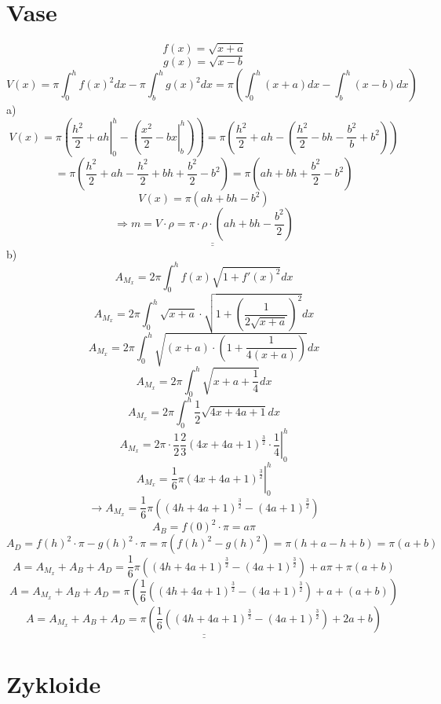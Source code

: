 \section{Vase}
\[ f(x) = \sqrt{x+a} \]
\[ g(x) = \sqrt{x-b} \]
\[ V(x) = \pi \int_0^h f(x)^2 dx - \pi \int_b^h g(x)^2dx = \pi \left( \int_0^h (x+a) dx - \int_b^h (x-b) dx\right) \]
a)
\[ V(x) = \pi\left(\left. \frac{h^2}{2} + ah \right|_0^h - \left(\left. \frac{x^2}{2} - bx \right|_b^h \right) \right) = \pi \left(  \frac{h^2}{2} + ah - \left( \frac{h^2}{2} - bh - \frac{b^2}{b} + b^2 \right)\right) \]
\[ = \pi \left(\frac{h^2}{2} + ah - \frac{h^2}{2} + bh + \frac{b^2}{2} - b^2\right) = \pi \left(ah + bh + \frac{b^2}{2} - b^2\right) \]
\[ V(x) = \pi \left(ah + bh - b^2\right) \]
\[ \Rightarrow \underline{\underline{m = V \cdot \rho = \pi \cdot \rho \cdot \left(ah + bh - \frac{b^2}{2}\right)}} \]
b)
\[ A_{M_x} = 2 \pi \int_0^h f(x) \sqrt{1 + f'(x)^2} dx \]
\[ A_{M_x} = 2 \pi \int_0^h \sqrt{x + a} \cdot \sqrt{1 + \left( \frac{1}{2 \sqrt{x + a}} \right)^2} dx \]
\[ A_{M_x} = 2 \pi \int_0^h \sqrt{(x + a) \cdot \left(1 + \frac{1}{4 (x + a)} \right)} dx \]
\[ A_{M_x} = 2 \pi \int_0^h \sqrt{x + a + \frac{1}{4}} dx \]
\[ A_{M_x} = 2 \pi \int_0^h \frac{1}{2} \sqrt{4x + 4a + 1} dx \]
\[ A_{M_x} = \left. 2 \pi \cdot \frac{1}{2} \frac{2}{3}\left( 4x + 4a + 1 \right)^{\frac{3}{2}} \cdot \frac{1}{4} \right|_0^h \]
\[ A_{M_x} = \left. \frac{1}{6} \pi \left(4x + 4a + 1\right)^{\frac{3}{2}} \right|_0^h \]
\[ \rightarrow A_{M_x} = \frac{1}{6} \pi \left(\left( 4h + 4a + 1 \right)^{\frac{3}{2}} - \left(4a + 1\right)^{\frac{3}{2}}\right) \]
\[ A_B = f(0)^2 \cdot \pi = a \pi \]
\[ A_D = f(h)^2 \cdot \pi - g(h)^2 \cdot \pi = \pi \left( f(h)^2 - g(h)^2 \right) = \pi \left( h + a - h + b \right) = \pi \left( a + b \right) \]
\[ A =  A_{M_x} + A_B + A_D = \frac{1}{6} \pi \left(\left( 4h + 4a + 1 \right)^{\frac{3}{2}} - \left(4a + 1\right)^{\frac{3}{2}}\right) + a \pi + \pi \left( a + b \right) \]
\[ A =  A_{M_x} + A_B + A_D = \pi \left(\frac{1}{6} \left(\left( 4h + 4a + 1 \right)^{\frac{3}{2}} - \left(4a + 1\right)^{\frac{3}{2}}\right) + a + \left( a + b \right)\right) \]
\[ \underline{\underline{A =  A_{M_x} + A_B + A_D = \pi \left(\frac{1}{6} \left(\left( 4h + 4a + 1 \right)^{\frac{3}{2}} - \left(4a + 1\right)^{\frac{3}{2}}\right) + 2a + b\right)}} \]

\section{Zykloide}

